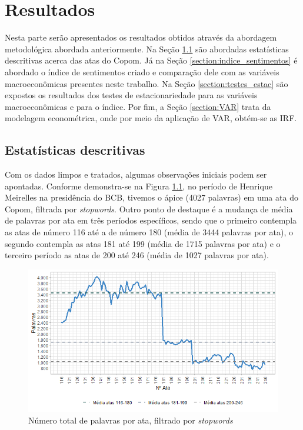 
\chapter{Resultados}

Nesta parte serão apresentados os resultados obtidos através da abordagem metodológica abordada anteriormente. Na Seção \ref{section:estat_desc} são abordadas estatísticas descritivas acerca das atas do Copom. Já na Seção \ref{section:indice_sentimentos} é abordado o índice de sentimentos criado e comparação dele com as variáveis macroeconômicas presentes neste trabalho. Na Seção \ref{section:testes_estac} são expostos os resultados dos testes de estacionariedade para as variáveis macroeconômicas e para o índice. Por fim, a Seção \ref{section:VAR} trata da modelagem econométrica, onde por meio da aplicação de VAR, obtém-se as IRF.

\section{Estatísticas descritivas} \label{section:estat_desc}

Com os dados limpos e tratados, algumas observações iniciais podem ser apontadas. Conforme demonstra-se na Figura \ref{figure:total_words}, no período de Henrique Meirelles na presidência do BCB, tivemos o ápice (4027 palavras) em uma ata do Copom, filtrada por \textit{stopwords}. Outro ponto de destaque é a mudança de média de palavras por ata em três períodos específicos, sendo que o primeiro contempla as atas de número 116 até a de número 180 (média de 3444 palavras por ata), o segundo contempla as atas 181 até 199 (média de 1715 palavras por ata) e o terceiro período as atas de 200 até 246 (média de 1027 palavras por ata).

\begin{figure}[hbtp]
	\centering
	\caption{Número total de palavras por ata, filtrado por \textit{stopwords}} \label{figure:total_words}
	\includegraphics[scale = 0.75]{figuras/grafico_total_words.png}
\end{figure}

